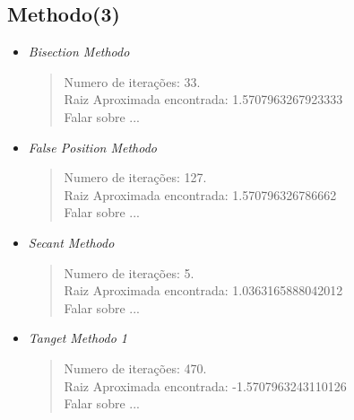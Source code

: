 \documentclass[12pt]{article}
\begin{document}
\subsection{Methodo(3)}
\begin{itemize}
    \item \textit{Bisection Methodo}\\
        \begin{verse}
          Numero de iterações: 33.\\
          Raiz Aproximada encontrada: 1.5707963267923333\\
          Falar sobre ...
        \end{verse}
    \item \textit{False Position Methodo}
        \begin{verse}
          Numero de iterações: 127.\\
          Raiz Aproximada encontrada: 1.570796326786662\\
          Falar sobre ...
        \end{verse}
    \item \textit{Secant Methodo}
        \begin{verse}
          Numero de iterações: 5.\\
          Raiz Aproximada encontrada: 1.0363165888042012\\
          Falar sobre ...
        \end{verse}
    \item \textit{Tanget Methodo 1}
        \begin{verse}
          Numero de iterações: 470.\\
          Raiz Aproximada encontrada: -1.5707963243110126\\
          Falar sobre ...
        \end{verse}
\end{itemize}
\end{document}
